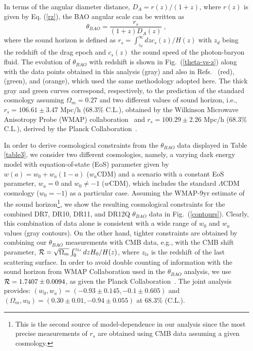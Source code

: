 \documentclass[a4paper,11pt]{article}
\begin{document}
In terms of the angular diameter distance, $D_A = r(z)/(1+z)$, where $r(z)$ is given by Eq. (\ref{rz}), the BAO angular scale can be written as
\begin{equation} \label{tz}
 \theta_{BAO} = \frac{r_s}{(1 + z) D_A(z)}\;,
\end{equation}
where the sound horizon is defined as $r_s = \int_{z_d}^{\infty}{dz}{c_s(z)/H(z)}$ with $z_d$ being the redshift of the drag epoch and $c_s(z)$ the sound speed of the photon-baryon fluid. The evolution of $\theta_{BAO}$ with redshift is shown in Fig.~(\ref{theta-vs-z}) along with the data points obtained in this analysis (gray) and also in Refs.~\cite{Carvalho} (red),~\cite{Alcaniz} (green), and \cite{deCarvalho} (orange), which used the same methodology adopted here. The thick gray and green curves correspond, respectively, to the prediction of the standard cosmology assuming $\Omega_m = 0.27$ and two different values of  sound horizon, i.e., $r_s = 106.61 \pm 3.47$ Mpc/h (68.3\% C.L.), obtained by the Wilkinson Microwave Anisotropy Probe (WMAP) collaboration~\cite{wmap9} and $r_s = 100.29 \pm 2.26$ Mpc/h (68.3\% C.L.), derived by the Planck Collaboration~\cite{planck}.

In order to derive cosmological constraints from the $\theta_{BAO}$ data displayed in Table \ref{table3}, we consider two different cosmologies, namely, a varying dark energy model with equation-of-state (EoS) parameter given by $w(a) = w_0 + w_a(1-a)$ ($w_a$CDM) and a scenario with a constant EoS parameter, $w_a = 0$ and $w_0 \neq -1$ ($w$CDM), which includes the standard $\Lambda$CDM cosmology ($w_0 = -1$) as a particular case. Assuming the WMAP-9yr estimate of the sound horizon\footnote{This is the second source of model-dependence in our analysis since the most precise measurements of $r_s$ are obtained using CMB data assuming a given cosmology.}, we show the resulting cosmological constraints for the combined DR7, DR10, DR11, and DR12Q $\theta_{BAO}$ data in Fig.~(\ref{contours}). Clearly, this combination of data alone is consistent with a wide range of $w_0$ and $w_a$ values (gray contours). On the other hand, tighter constraints are obtained by combining our $\theta_{BAO}$ measurements with CMB data, e.g., with the CMB shift parameter, ${\cal{R}} = \sqrt{\Omega_m}\int_{0}^{z_{ls}}dz {H_0/H(z)}$, where $z_{ls}$ is the redshift of the last scattering surface. In order to avoid double counting of information with the sound horizon from WMAP Collaboration used in the $\theta_{BAO}$ analysis, we use ${\cal{R}} = 1.7407 \pm 0.0094$, as  given the Planck Collaboration~\cite{planck}. The joint analysis provides: $(w_0, w_a) = (-0.93 \pm 0.145, -0.1 \pm 0.605)$ and $(\Omega_m, w_0) = (0.30 \pm 0.01, -0.94 \pm 0.055)$ at 68.3\% (C.L.).
\end{document}

